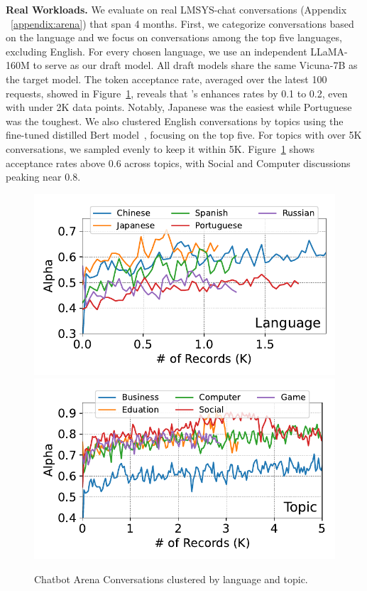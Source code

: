 {\bf Real Workloads.} We evaluate \tool on real LMSYS-chat conversations (Appendix ~\ref{appendix:arena}) that span 4 months.
First, we categorize conversations based on the language and we focus on conversations among the top five languages, excluding English. For every chosen language, we use an independent LLaMA-160M to serve as our draft model. All draft models share the same Vicuna-7B as the target model. The token acceptance rate, averaged over the latest 100 requests, showed in Figure~\ref{fig:arena}, reveals that \tool's enhances rates by 0.1 to 0.2, even with under 2K data points. Notably, Japanese was the easiest while Portuguese was the toughest.
We also clustered English conversations by topics using the fine-tuned distilled Bert model~\citep{distill-bert-topic}, focusing on the top five. For topics with over 5K conversations, we sampled evenly to keep it within 5K. Figure~\ref{fig:arena} shows acceptance rates above 0.6 across topics, with Social and Computer discussions peaking near 0.8.
\begin{figure}
    \vspace{-10pt}
    \centering
    \includegraphics[width=0.4\linewidth]{figures/arena_language.pdf}
    \includegraphics[width=0.4\linewidth]{figures/arena_class.pdf}
    \vspace{-10pt}
    \caption{Chatbot Arena Conversations clustered by language and topic.}
    \label{fig:arena}
\end{figure}

